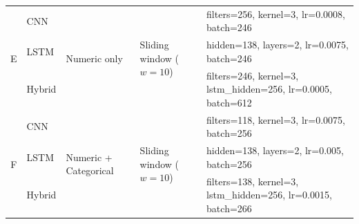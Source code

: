 \begin{landscape}
\begin{table}[htbp]
\begin{tabular}{cll l p{9.4cm}}
\hline
\multirow{3}{*}{E} & CNN    & \multirow{3}{*}{Numeric only} & \multirow{3}{*}{Sliding window ($w=10$)} & filters=256, kernel=3, lr=0.0008, batch=246 \\ 
                   & LSTM   & & & hidden=138, layers=2, lr=0.0075, batch=246 \\ 
                   & Hybrid & & & filters=246, kernel=3, lstm\_hidden=256, lr=0.0005, batch=612 \\ 
\hline
\multirow{3}{*}{F} & CNN    & \multirow{3}{*}{Numeric + Categorical} & \multirow{3}{*}{Sliding window ($w=10$)} & filters=118, kernel=3, lr=0.0075, batch=256 \\ 
                   & LSTM   & & & hidden=138, layers=2, lr=0.005, batch=256 \\ 
                   & Hybrid & & & filters=138, kernel=3, lstm\_hidden=256, lr=0.0015, batch=266 \\ 
\hline
\end{tabular}
\vspace*{\fill}
\end{table}
\end{landscape}